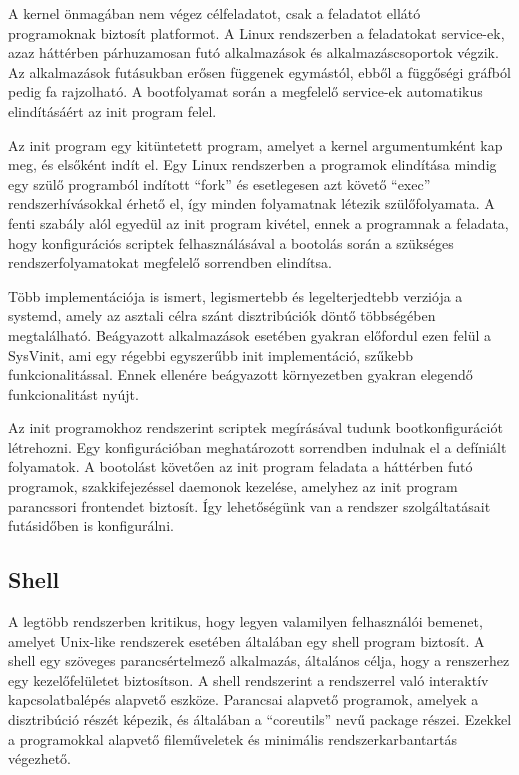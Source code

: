 A kernel önmagában nem végez célfeladatot, csak a feladatot ellátó programoknak
biztosít platformot. A Linux rendszerben a feladatokat service-ek, azaz háttérben
párhuzamosan futó alkalmazások és alkalmazáscsoportok végzik. Az alkalmazások
futásukban erősen függenek egymástól, ebből a függőségi gráfból pedig fa
rajzolható. A bootfolyamat során a megfelelő service-ek automatikus elindításáért
az init program felel.

\medskip

Az init program egy kitüntetett program, amelyet a kernel argumentumként kap meg,
és elsőként indít el. Egy Linux rendszerben a programok elindítása mindig egy
szülő programból indított ``fork\(\)'' és esetlegesen azt követő ``exec\(\)''
rendszerhívásokkal érhető el, így minden folyamatnak létezik szülőfolyamata. A
fenti szabály alól egyedül az init program kivétel, ennek a programnak a
feladata, hogy konfigurációs scriptek felhasználásával a bootolás során a
szükséges rendszerfolyamatokat megfelelő sorrendben elindítsa.

Több implementációja is ismert, legismertebb és legelterjedtebb verziója a
systemd, amely az asztali célra szánt disztribúciók döntő többségében
megtalálható. Beágyazott alkalmazások esetében gyakran előfordul ezen felül a
SysVinit, ami egy régebbi egyszerűbb init implementáció, szűkebb
funkcionalitással. Ennek ellenére beágyazott környezetben gyakran elegendő
funkcionalitást nyújt.

Az init programokhoz rendszerint scriptek megírásával tudunk bootkonfigurációt
létrehozni. Egy konfigurációban meghatározott sorrendben indulnak el a defíniált
folyamatok. A bootolást követően az init program feladata a háttérben futó
programok, szakkifejezéssel daemonok kezelése, amelyhez az init program
parancssori frontendet biztosít. Így lehetőségünk van a rendszer szolgáltatásait
futásidőben is konfigurálni.

\subsection{Shell}

A legtöbb rendszerben kritikus, hogy legyen valamilyen felhasználói bemenet,
amelyet Unix-like rendszerek esetében általában egy shell program biztosít. A
shell egy szöveges parancsértelmező alkalmazás, általános célja, hogy a
renszerhez egy kezelőfelületet biztosítson. A shell rendszerint a rendszerrel
való interaktív kapcsolatbalépés alapvető eszköze. Parancsai alapvető programok,
amelyek a disztribúció részét képezik, és általában a ``coreutils'' nevű package
részei. Ezekkel a programokkal alapvető fileműveletek és minimális
rendszerkarbantartás végezhető.

